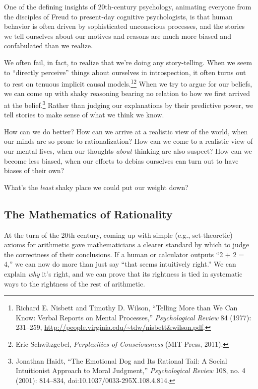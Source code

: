 {
 One of the defining insights of 20th-century psychology, animating
everyone from the disciples of Freud to present-day cognitive
psychologists, is that human behavior is often driven by sophisticated
unconscious processes, and the stories we tell ourselves about our
motives and reasons are much more biased and confabulated than we
realize.}

{
 We often fail, in fact, to realize that we're
doing any story-telling. When we seem to ``directly
perceive'' things about ourselves in introspection,
it often turns out to rest on tenuous implicit causal
models.\footnote{Richard E. Nisbett and Timothy D. Wilson,
``Telling More than We Can Know: Verbal Reports on
Mental Processes,'' \textit{Psychological Review} 84
(1977): 231--259,
\url{http://people.virginia.edu/\~tdw/nisbett\&wilson.pdf}.}\supercomma\footnote{Eric Schwitzgebel, \textit{Perplexities of Consciousness} (MIT
Press, 2011).} When we try to argue for our beliefs, we
can come up with shaky reasoning bearing no relation to how we first
arrived at the belief.\footnote{Jonathan Haidt, ``The Emotional Dog and Its
Rational Tail: A Social Intuitionist Approach to Moral
Judgment,'' \textit{Psychological Review} 108, no. 4
(2001): 814--834, doi:10.1037/0033-295X.108.4.814.} Rather than judging our
explanations by their predictive power, we tell stories to make sense
of what we think we know.}

{
 How can we do better? How can we arrive at a realistic view of the
world, when our minds are so prone to rationalization? How can we come
to a realistic view of our mental lives, when our thoughts
\textit{about} thinking are also suspect? How can we become less
biased, when our efforts to debias ourselves can turn out to have
biases of their own?}

{
 What's the \textit{least} shaky place we could put
our weight down?}


\subsection{The Mathematics of Rationality}

{
 At the turn of the 20th century, coming up with simple (e.g.,
set-theoretic) axioms for arithmetic gave mathematicians a clearer
standard by which to judge the correctness of their conclusions. If a
human or calculator outputs ``2 + 2 =
4,'' we can now do more than just say
``that seems intuitively right.'' We
can explain \textit{why} it's right, and we can prove
that its rightness is tied in systematic ways to the rightness of the
rest of arithmetic.}

